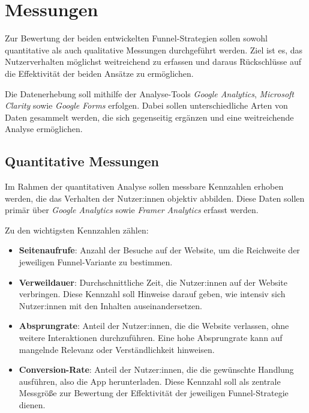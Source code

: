 \setauthor{\firstauthor}
\section{Messungen}

Zur Bewertung der beiden entwickelten Funnel-Strategien sollen sowohl 
quantitative als auch qualitative Messungen durchgeführt werden. 
Ziel ist es, das Nutzerverhalten möglichst weitreichend zu erfassen und 
daraus Rückschlüsse auf die Effektivität der beiden Ansätze zu 
ermöglichen.

Die Datenerhebung soll mithilfe der
Analyse-Tools \textit{Google Analytics}, \textit{Microsoft Clarity} 
sowie \textit{Google Forms} erfolgen. Dabei sollen unterschiedliche 
Arten von Daten gesammelt werden, die sich gegenseitig ergänzen und 
eine weitreichende Analyse ermöglichen.

\subsection{Quantitative Messungen}

Im Rahmen der quantitativen Analyse sollen messbare Kennzahlen 
erhoben werden, die das Verhalten der Nutzer:innen objektiv 
abbilden. Diese Daten sollen primär über \textit{Google Analytics} 
sowie \textit{Framer Analytics} erfasst werden.

Zu den wichtigsten Kennzahlen zählen:

\begin{itemize}
    \item \textbf{Seitenaufrufe}: Anzahl der Besuche auf 
    der Website, um die Reichweite der jeweiligen Funnel-Variante 
    zu bestimmen.
    \item \textbf{Verweildauer}: Durchschnittliche Zeit, die 
    Nutzer:innen auf der Website verbringen. Diese Kennzahl 
    soll Hinweise darauf geben, wie intensiv sich Nutzer:innen 
    mit den Inhalten auseinandersetzen.
    \item \textbf{Absprungrate}: Anteil der Nutzer:innen, 
    die die Website verlassen, ohne weitere Interaktionen 
    durchzuführen. Eine hohe Absprungrate kann auf mangelnde 
    Relevanz oder Verständlichkeit hinweisen.
    \item \textbf{Conversion-Rate}: Anteil der Nutzer:innen, 
    die die gewünschte Handlung ausführen, also die App herunterladen. 
    Diese Kennzahl soll als zentrale Messgröße zur Bewertung der 
    Effektivität der jeweiligen Funnel-Strategie dienen.
\end{itemize}

